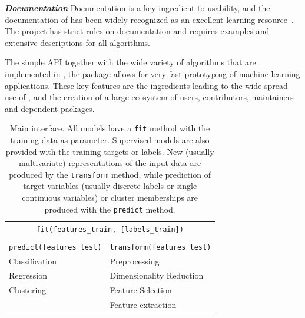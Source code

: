 \emph{\textbf{Documentation}}
Documentation is a key ingredient to usability, and the documentation of \sklearn{}
has been widely recognized as an excellent learning
resource~\autocite{testimonials, benlorica, kdnuggetstopten, lovesklearn}. The
\sklearn{} project has strict rules on documentation and requires examples and
extensive descriptions for all algorithms.

The simple API together with the wide variety of algorithms that are
implemented in \sklearn{}, the package allows for very fast prototyping of
machine learning applications.
These key features are the ingredients leading to the wide-spread use of
\sklearn{}, and the creation of a large ecosystem of users, contributors,
maintainers and dependent packages.

\begin{table}
    \caption{Main \sklearn interface. All models have a \texttt{fit} method
    with the training data as parameter. Supervised models are also provided
    with the training targets or labels. New (usually multivariate)
    representations of the input data are produced by the \texttt{transform}
    method, while prediction of target variables (usually discrete labels or
    single continuous variables) or cluster memberships are produced with the
    \texttt{predict} method.
}
\begin{center}
    \begin{tabular}{p{} p{}}
    \multicolumn{2}{c}{\texttt{fit(features\_train, [labels\_train])}}\\\\
    \texttt{predict(features\_test)} & \texttt{transform(features\_test)}\\
    \cmidrule[1pt](r{1em}){1-1} \cmidrule[1pt](l){2-2}
    Classification & Preprocessing\\
    Regression & Dimensionality Reduction\\
    Clustering & Feature Selection\\
               & Feature extraction\\
    \end{tabular}
\end{center}
\label{api}
\end{table}

